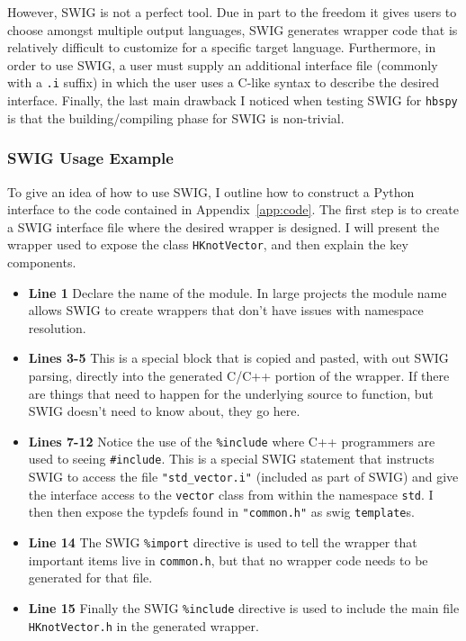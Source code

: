   However, SWIG is not a perfect tool. Due in part to the freedom it gives users to choose amongst multiple output languages, SWIG generates wrapper code that is relatively difficult to customize for a specific target language. Furthermore, in order to use SWIG, a user must supply an additional interface file (commonly with a \texttt{.i} suffix) in which the user uses a C-like syntax to describe the desired interface. Finally, the last main drawback I noticed when testing SWIG for \texttt{hbspy} is that the building/compiling phase for SWIG is non-trivial.  

  \subsubsection{SWIG Usage Example} \label{ssub:swig_usage_example}

    To give an idea of how to use SWIG, I outline how to construct a Python interface to the code contained in Appendix~\ref{app:code}. The first step is to create a SWIG interface file where the desired wrapper is designed. I will present the wrapper used to expose the class \texttt{HKnotVector}, and then explain the key components.

    \vspace{.2in}
    

    \begin{itemize}
      \item \textbf{Line 1} Declare the name of the module. In large projects the module name allows SWIG to create wrappers that don't have issues with namespace resolution.
      \item \textbf{Lines 3-5} This is a special block that is copied and pasted, with out SWIG parsing, directly into the generated C/C++ portion of the wrapper. If there are things that need to happen for the underlying source to function, but SWIG doesn't need to know about, they go here.
      \item \textbf{Lines 7-12} Notice the use of the \texttt{\%include} where C++ programmers are used to seeing \texttt{\#include}. This is a special SWIG statement that instructs SWIG to access the file \texttt{"std\_vector.i"} (included as part of SWIG) and give the interface access to the \texttt{vector} class from within the namespace \texttt{std}. I then then expose the typdefs found in \texttt{"common.h"} as swig \texttt{template}s.
      \item \textbf{Line 14} The SWIG \texttt{\%import} directive is used to tell the wrapper that important items live in \texttt{common.h}, but that no wrapper code needs to be generated for that file.
      \item \textbf{Line 15} Finally the SWIG \texttt{\%include} directive is used to include the main file \texttt{HKnotVector.h} in the generated wrapper.
    \end{itemize}
    \mainstretch{}


